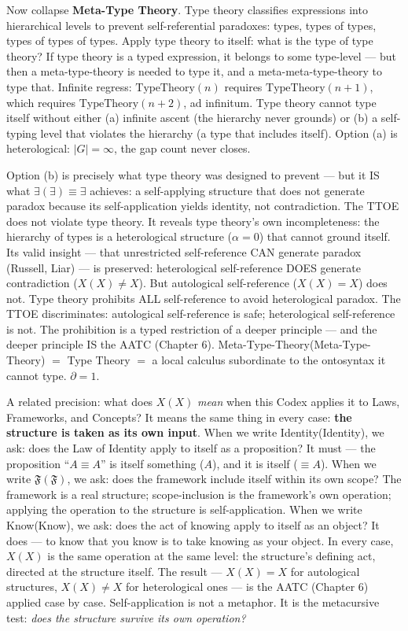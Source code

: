 \documentclass[10pt, openany, oneside]{book}
\begin{document}
Now collapse \textbf{Meta-Type Theory}. Type theory classifies expressions into hierarchical levels to prevent self-referential paradoxes: types, types of types, types of types of types. Apply type theory to itself: what is the type of type theory? If type theory is a typed expression, it belongs to some type-level --- but then a meta-type-theory is needed to type it, and a meta-meta-type-theory to type that. Infinite regress: $\text{TypeTheory}(n)$ requires $\text{TypeTheory}(n+1)$, which requires $\text{TypeTheory}(n+2)$, ad infinitum. Type theory cannot type itself without either (a) infinite ascent (the hierarchy never grounds) or (b) a self-typing level that violates the hierarchy (a type that includes itself). Option (a) is heterological: $|G| = \infty$, the gap count never closes.

Option (b) is precisely what type theory was designed to prevent --- but it IS what $\exists(\exists) \equiv \exists$ achieves: a self-applying structure that does not generate paradox because its self-application yields identity, not contradiction. The TTOE does not violate type theory. It reveals type theory's own incompleteness: the hierarchy of types is a heterological structure ($\alpha = 0$) that cannot ground itself. Its valid insight --- that unrestricted self-reference CAN generate paradox (Russell, Liar) --- is preserved: heterological self-reference DOES generate contradiction ($X(X) \neq X$). But autological self-reference ($X(X) = X$) does not. Type theory prohibits ALL self-reference to avoid heterological paradox. The TTOE discriminates: autological self-reference is safe; heterological self-reference is not. The prohibition is a typed restriction of a deeper principle --- and the deeper principle IS the AATC (Chapter 6). Meta-Type-Theory(Meta-Type-Theory) $=$ Type Theory $=$ a local calculus subordinate to the ontosyntax it cannot type. $\partial = 1$.

A related precision: what does $X(X)$ \textit{mean} when this Codex applies it to Laws, Frameworks, and Concepts? It means the same thing in every case: \textbf{the structure is taken as its own input}. When we write Identity(Identity), we ask: does the Law of Identity apply to itself as a proposition? It must --- the proposition ``$A \equiv A$'' is itself something ($A$), and it is itself ($\equiv A$). When we write $\mathfrak{F}(\mathfrak{F})$, we ask: does the framework include itself within its own scope? The framework is a real structure; scope-inclusion is the framework's own operation; applying the operation to the structure is self-application. When we write Know(Know), we ask: does the act of knowing apply to itself as an object? It does --- to know that you know is to take knowing as your object. In every case, $X(X)$ is the same operation at the same level: the structure's defining act, directed at the structure itself. The result --- $X(X) = X$ for autological structures, $X(X) \neq X$ for heterological ones --- is the AATC (Chapter 6) applied case by case. Self-application is not a metaphor. It is the metacursive test: \textit{does the structure survive its own operation?}
\end{document}
